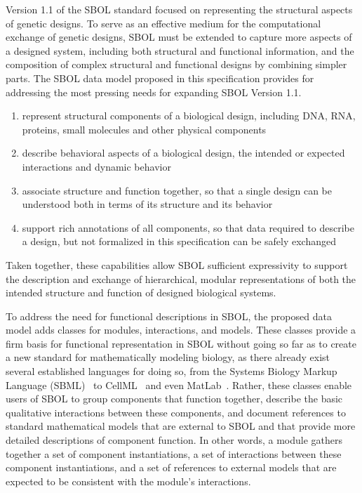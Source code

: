 Version 1.1 of the SBOL standard focused on representing the structural aspects of genetic designs. To serve as an effective medium for the computational exchange of genetic designs, SBOL must be extended to capture more aspects of a designed system, including both structural and functional information, and the composition of complex structural and functional designs by combining simpler parts. The SBOL data model proposed in this specification provides for addressing the most pressing needs for expanding SBOL Version 1.1. 

\begin{enumerate}

\item represent structural components of a biological design, including DNA, RNA, proteins, small molecules and other physical components

\item describe behavioral aspects of a biological design, the intended or expected interactions and dynamic behavior

\item associate structure and function together, so that a single design can be understood both in terms of its structure and its behavior

\item support rich annotations of all components, so that data required to describe a design, but not formalized in this specification can be safely exchanged

\end{enumerate}

Taken together, these capabilities allow SBOL sufficient expressivity to support the description and exchange of hierarchical, modular representations of both the intended structure and function of designed biological systems.

To address the need for functional descriptions in SBOL, the proposed data model adds classes for modules, interactions, and models. These classes provide a firm basis for functional representation in SBOL without going so far as to create a new standard for mathematically modeling biology, as there already exist several established languages for doing so, from the Systems Biology Markup Language (SBML)~\cite{SBML} to CellML~\cite{CellML} and even MatLab~\cite{matlab}. Rather, these classes enable users of SBOL to group components that function together, describe the basic qualitative interactions between these components, and document references to standard mathematical models that are external to SBOL and that provide more detailed descriptions of component function. In other words, a module gathers together a set of component instantiations, a set of interactions between these component instantiations, and a set of references to external models that are expected to be consistent with the module's interactions.

